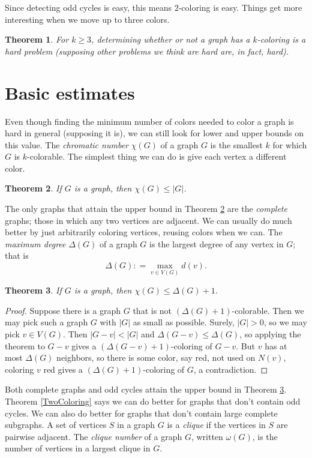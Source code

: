 \documentclass{tufte-book} %
\theoremstyle{plain}
\newtheorem{theorem}{Theorem}
\newcommand{\card}[1]{\left|#1\right|}
\newcommand{\parens}[1]{\left( #1 \right)}
\newcommand{\DefinedAs}{\mathrel{\mathop:}=}
\begin{document}
Since detecting odd cycles is easy, this means $2$-coloring is easy. Things get more interesting when we move up to three colors.
\begin{theorem}
For $k \ge 3$, determining whether or not a graph has a $k$-coloring is a hard problem (supposing other problems we think are hard are, in fact, hard).
\end{theorem}

\section{Basic estimates}
Even though finding the minimum number of colors needed to color a graph is hard in general (supposing it is), we can still
look for lower and upper bounds on this value.  The \emph{chromatic number} $\chi(G)$ of a graph $G$ is the smallest $k$ for which $G$ is $k$-colorable.
The simplest thing we can do is give each vertex a different color.
\begin{theorem}\label{WorstUpperBound}
If $G$ is a graph, then $\chi(G) \le \card{G}$.
\end{theorem}
The only graphs that attain the upper bound in Theorem \ref{WorstUpperBound} are the \emph{complete} graphs; those in which
any two vertices are adjacent. 
We can usually do much better by just arbitrarily coloring vertices, reusing colors when we can.  
The \emph{maximum degree} $\Delta(G)$ of a graph $G$ is the largest degree
of any vertex in $G$; that is 
\[\Delta(G) \DefinedAs \max_{v \in V(G)} d(v).\]

\begin{theorem}\label{SecondWorstUpperBound}
If $G$ is a graph, then $\chi(G) \le \Delta(G) + 1$.
\end{theorem}
\begin{proof}
Suppose there is a graph $G$ that is not $\parens{\Delta(G) + 1}$-colorable.  Then we may pick such a graph $G$ with $\card{G}$ as small as possible.
Surely, $\card{G} > 0$, so we may pick $v \in V(G)$.  Then $\card{G-v} < \card{G}$ and $\Delta(G-v) \le \Delta(G)$, so applying the theorem to $G-v$ gives a $\parens{\Delta(G-v) + 1}$-coloring
of $G-v$.  But $v$ has at most $\Delta(G)$ neighbors, so there is some color, say red, not used on $N(v)$, coloring $v$ red gives a $\parens{\Delta(G) + 1}$-coloring
of $G$, a contradiction.
\end{proof}

Both complete graphs and odd cycles attain the upper bound in Theorem \ref{SecondWorstUpperBound}.  Theorem \ref{TwoColoring} says
we can do better for graphs that don't contain odd cycles.  We can also do better for graphs that don't contain large complete subgraphs.
A set of vertices $S$ in a graph $G$ is a \emph{clique} if the vertices in $S$ are pairwise adjacent.
The \emph{clique number} of a graph $G$, written $\omega(G)$, is the number of vertices in a largest clique in $G$.
\end{document}
